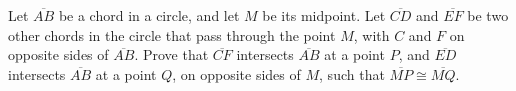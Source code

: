 Let $\overline{AB}$ be a chord in a circle,
and let $M$ be its midpoint.
Let $\overline{CD}$ and $\overline{EF}$ be two other chords in the circle
that pass through the point $M$,
with $C$ and $F$ on opposite sides of $\overline{AB}$.
Prove that $\overline{CF}$ intersects $\overline{AB}$ at a point $P$,
and $\overline{ED}$ intersects $\overline{AB}$ at a point $Q$,
on opposite sides of $M$,
such that $\overline{MP} \cong \overline{MQ}$.
